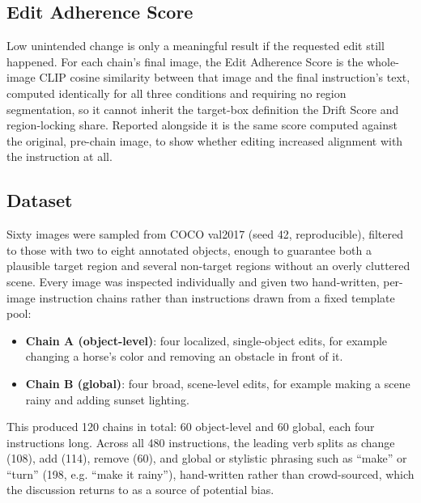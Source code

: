 \subsection{Edit Adherence Score}
\label{sec:adherence}
Low unintended change is only a meaningful result if the requested edit still happened. For each chain's final image, the Edit Adherence Score is the whole-image CLIP cosine similarity between that image and the final instruction's text, computed identically for all three conditions and requiring no region segmentation, so it cannot inherit the target-box definition the Drift Score and region-locking share. Reported alongside it is the same score computed against the original, pre-chain image, to show whether editing increased alignment with the instruction at all.

\subsection{Dataset}
Sixty images were sampled from COCO val2017 (seed 42, reproducible), filtered to those with two to eight annotated objects, enough to guarantee both a plausible target region and several non-target regions without an overly cluttered scene. Every image was inspected individually and given two hand-written, per-image instruction chains rather than instructions drawn from a fixed template pool:
\begin{itemize}[itemsep=1pt,topsep=2pt,parsep=0pt,leftmargin=*]
\item \textbf{Chain A (object-level)}: four localized, single-object edits, for example changing a horse's color and removing an obstacle in front of it.
\item \textbf{Chain B (global)}: four broad, scene-level edits, for example making a scene rainy and adding sunset lighting.
\end{itemize}
This produced 120 chains in total: 60 object-level and 60 global, each four instructions long. Across all 480 instructions, the leading verb splits as change (108), add (114), remove (60), and global or stylistic phrasing such as ``make'' or ``turn'' (198, e.g. ``make it rainy''), hand-written rather than crowd-sourced, which the discussion returns to as a source of potential bias.

